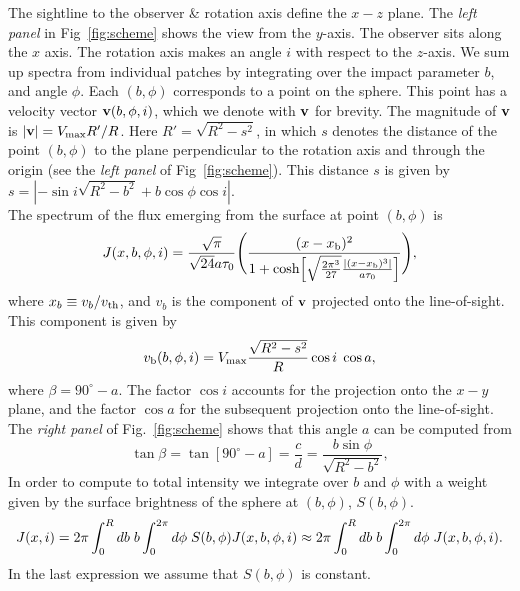 %
The sightline to the observer \& rotation axis define the $x-z$ plane.
The {\it left panel} in Fig~\ref{fig:scheme} shows the view from the $y$-axis.
The observer sits along the $x$ axis.
The rotation axis makes an angle $i$ with respect to the $z$-axis.
We sum up spectra from individual patches by integrating over the
impact parameter $b$, and angle $\phi$.
Each $(b,\phi)$ corresponds to a point on the sphere.
This point has a velocity vector ${\bf v}(b,\phi,i)$, which we denote
with ${\bf v}$ for brevity. The magnitude of ${\bf v}$ is $|{\bf v}|=V_{\rm max}R'/R$. Here $R'=\sqrt{R^2 -s^2}$, in which $s$ denotes the distance of the point $(b,\phi)$ to the plane perpendicular to the rotation axis and through the origin (see the {\it left panel} of Fig~\ref{fig:scheme}). This distance $s$ is given by $s=|-\sin i\sqrt{R^2-b^2}+ b \cos \phi \cos i|$.\\
The spectrum of the flux emerging from the surface at point $(b,\phi)$ is
\begin{displaymath}
J(x,b,\phi,i)=\frac{\sqrt{\pi}}{\sqrt{24}a\tau_0}\Bigg{(}\frac{(x-x_{\rm
b})^2}{1+{\rm cosh}\Big{[}\sqrt{\frac{2\pi^3}{27}}\frac{|(x
-x_{\rm b})^3|}{a\tau_0}\Big{]}}\Bigg{)},
\end{displaymath}
%
where $x_b\equiv v_{b}/v_{\rm th}$, and $v_b$ is the component of ${\bf v}$ projected onto the line-of-sight. This component is given by
\begin{equation}
v_{\rm b}(b,\phi,i)=V_{\rm max}\frac{\sqrt{R^2 -s^2}}{R}\cos i {\hspace{1mm}}
\cos a,
\end{equation}
where $\beta = 90^{\circ}-a$. The factor $\cos i$ accounts for the projection onto the $x-y$ plane, and the factor $\cos a$ for the subsequent projection onto the line-of-sight. The {\it right panel} of Fig.~\ref{fig:scheme} shows that this angle $a$ can be computed from
%
\begin{equation}
\tan \beta =\tan[90^{\circ}-a]=\frac{c}{d}=\frac{ b\sin \phi}{\sqrt{R^2 -b^2}},
\end{equation}
%
In order to compute to total intensity we integrate over $b$ and
$\phi$ with a weight given by the surface brightness of the
sphere at $(b,\phi)$, $S(b,\phi)$.
\begin{displaymath}
J(x,i)=2\pi \int_0^Rdb {\hspace{1mm}} b \int_0^{2\pi}d\phi {\hspace{1mm}}
S(b,\phi)J(x,b,\phi,i) \approx 2\pi \int_0^Rdb {\hspace{1mm}} b
\int_0^{2\pi}d\phi {\hspace{1mm}} J(x,b,\phi,i)\\ \nonumber.
\end{displaymath}
%
In the last expression we assume that $S(b,\phi)$ is constant.
